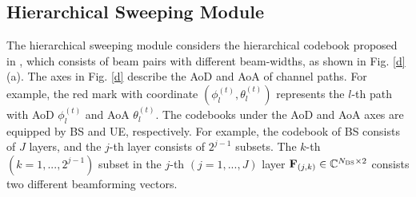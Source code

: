 \documentclass[journal,12pt,onecolumn,draftclsnofoot,]{IEEEtran}
\begin{document}
\subsection{Hierarchical Sweeping Module}
\vspace{-1.5mm}
{\color{black}
The hierarchical sweeping module considers the hierarchical codebook proposed in \cite{a12}, which consists of beam pairs with different beam-widths, as shown in Fig. \ref{d}(a). 
The axes in Fig. \ref{d} describe the AoD and AoA of channel paths. For example, the red mark with coordinate $(\phi_{l}^{(t)},\theta_{l}^{(t)})$ represents the $l$-th path with AoD $\phi_{l}^{(t)}$ and AoA $\theta_{l}^{(t)}$. 
The codebooks under the AoD and AoA axes are equipped by BS and UE, respectively. 
For example, the codebook of BS consists of $J$ layers, and the $j$-th layer consists of $2^{j-1}$ subsets. 
The $k$-th $(k=1,...,2^{j-1})$ subset in the $j$-th $(j=1,...,J)$ layer ${ {{{\bf{F}}_{({j,k} )}}} } \in {\mathbb{C}^{{N_{{\rm BS}}} \times {2}}}$ consists two different beamforming vectors.
}
\end{document}
